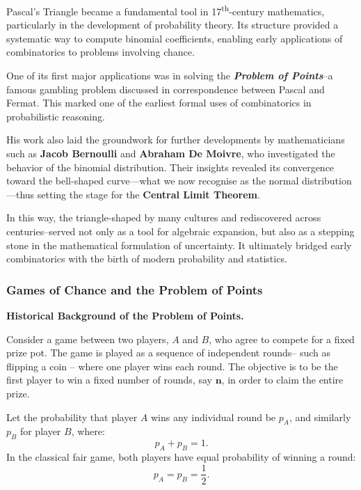 Pascal’s Triangle became a fundamental tool in 17\textsuperscript{th}-century mathematics, particularly in the development of probability theory. Its structure provided a systematic way to compute binomial coefficients, enabling early applications of combinatorics to problems involving chance.

One of its first major applications was in solving the \textbf{\textit{Problem of Points}}--a famous gambling problem discussed in correspondence between Pascal and Fermat. This marked one of the earliest formal uses of combinatorics in probabilistic reasoning.

His work also laid the groundwork for further developments by mathematicians such as \textbf{Jacob Bernoulli} and \textbf{Abraham De Moivre}, who investigated the behavior of the binomial distribution. Their insights revealed its convergence toward the bell-shaped curve—what we now recognise as the normal distribution—thus setting the stage for the \textbf{Central Limit Theorem}.

In this way, the triangle-shaped by many cultures and rediscovered across centuries--served not only as a tool for algebraic expansion, but also as a stepping stone in the mathematical formulation of uncertainty. It ultimately bridged early combinatorics with the birth of modern probability and statistics.

\subsubsection{Games of Chance and the Problem of Points}

\noindent \textbf{Historical Background of the Problem of Points.}
\vspace{0.5em}

Consider a game between two players, \(A\) and \(B\), who agree to compete for a fixed prize pot. The game is played as a sequence of independent rounds--
such as flipping a coin -- where one player wins each round. The objective is to be the first player to win a fixed number of rounds, say \(\mathbf{n}\), in order to claim the entire prize.

Let the probability that player \(A\) wins any individual round be \(p_A\), and similarly \(p_B\) for player \(B\), where:
\[
p_A + p_B = 1.
\]
In the classical fair game, both players have equal probability of winning a round:
\[
p_A = p_B = \frac{1}{2}.
\]

